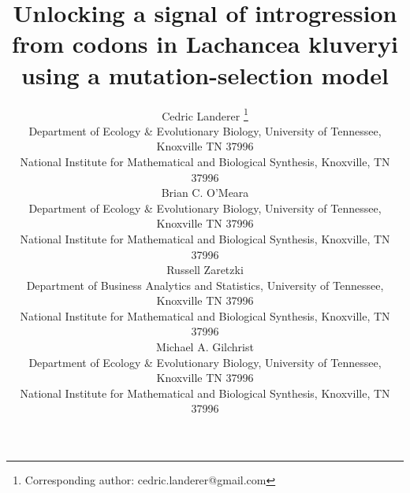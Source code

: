 \documentclass[fleqn,letterpaper]{article}
\begin{document}
\linenumbers

  \newcommand{\package}{\textbf{AnaCoDa}\xspace} %
  \newcommand{\kluyveri}{\textit{L. kluyveri}\xspace}
  \newcommand{\dubl}{\textit{C. dubliniensis}\xspace}
  \newcommand{\gossypii}{\textit{E. gossypii}\xspace}
  \newcommand{\ROC}{ROC SEMPPR\xspace}
  \newcommand{\GC}{GC content\xspace}
  \newcommand{\DM}{\ensuremath{{\Delta M}}\xspace}
  \newcommand{\DE}{\ensuremath{{\Delta \eta}}\xspace}
  \newcommand{\Lik}{\ensuremath{\mathcal{L}}\xspace}

  
\title{Unlocking a signal of introgression from codons in Lachancea kluveryi using a mutation-selection model}

\author{
  Cedric Landerer \thanks{Corresponding author: cedric.landerer@gmail.com}\\
  \small  Department of Ecology \& Evolutionary  Biology, University of Tennessee, Knoxville TN 37996\\
  \small National Institute for Mathematical and Biological Synthesis, Knoxville, TN 37996\\
  Brian C. O'Meara \\
  \small  Department of Ecology \& Evolutionary  Biology, University of Tennessee, Knoxville TN 37996\\
  \small National Institute for Mathematical and Biological Synthesis, Knoxville, TN 37996\\
  Russell Zaretzki\\ 
  \small Department of Business Analytics and Statistics, University of Tennessee, Knoxville TN 37996\\
  \small National Institute for Mathematical and Biological Synthesis, Knoxville, TN 37996\\
  Michael A. Gilchrist\\
  \small  Department of Ecology \& Evolutionary  Biology, University of Tennessee, Knoxville TN 37996\\
  \small National Institute for Mathematical and Biological Synthesis, Knoxville, TN 37996\\
}

\maketitle

\pagebreak
  
\end{document}
